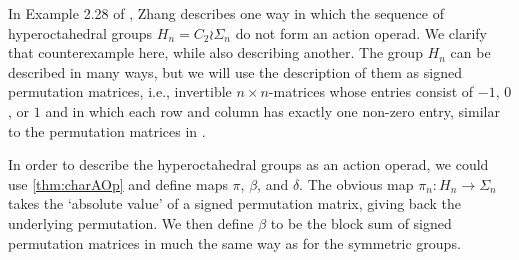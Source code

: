 \begin{nonex}\label{nonex:counterex2}
In Example 2.28 of \cite{zhang-grp}, Zhang describes one way in which the sequence of hyperoctahedral groups $H_n = C_2 \wr \Sigma_n$ do not form an action operad. We clarify that counterexample here, while also describing another. The group $H_n$ can be described in many ways, but we will use the description of them as signed permutation matrices, i.e., invertible $n \times n$-matrices whose entries consist of $-1$, $0$, or $1$ and in which each row and column has exactly one non-zero entry, similar to the permutation matrices in .

In order to describe the hyperoctahedral groups as an action operad, we could use \cref{thm:charAOp} and define maps $\pi$, $\beta$, and $\delta$. The obvious map $\pi_n \colon H_n \rightarrow \Sigma_n$ takes the `absolute value' of a signed permutation matrix, giving back the underlying permutation. We then define $\beta$ to be the block sum of signed permutation matrices in much the same way as for the symmetric groups.



\end{nonex}
